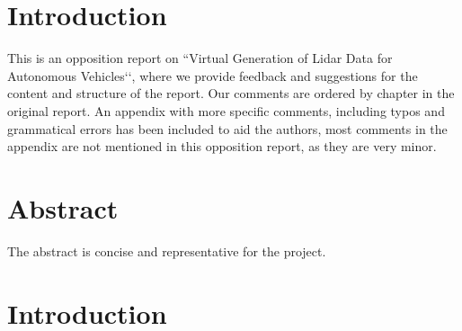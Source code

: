 \documentclass[12pt,a4paper,twoside,openright]{report}
\begin{document}
 


\newcommand{\varHeadline}{Opponering av DATX02-17-10}
\newcommand{\varSubtitle}{Av DATX02-17-12}
\newcommand{\varDepartment}{Department of Computer Science and Engineering}
\newcommand{\varNames}{André Perzon, Björn Strömberg, Chi Thong Luong,  \\
Elias Forsberg, Jesper Åberg, Jon Johnsson}




\section*{Introduction}
	
	This is an opposition report on ``Virtual Generation of Lidar Data for
	Autonomous Vehicles‘‘, where we provide feedback and suggestions for the
	content and structure of the report. Our comments are ordered by chapter in
	the original report. An appendix with more specific comments, including
	typos and grammatical errors has been included to aid the authors, most 
	comments in the appendix are not mentioned in this opposition report, as 
	they are very minor.

\section*{Abstract}

	The abstract is concise and representative for the project.

\section*{Introduction}
\end{document}
